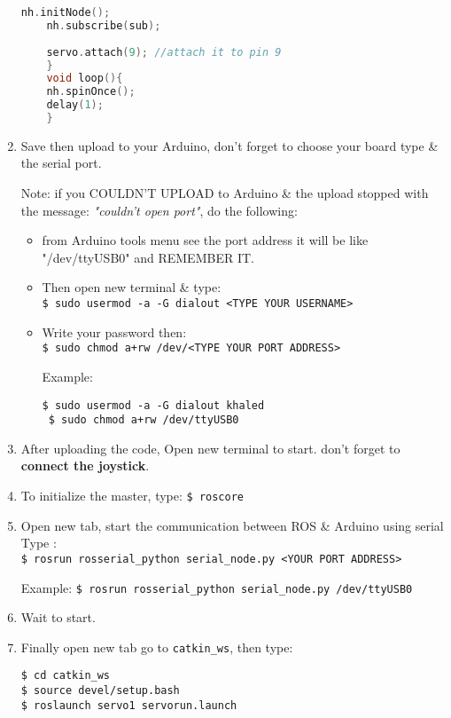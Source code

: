 \begin{enumerate}
\begin{lstlisting}[language=CPP]
 	nh.initNode();
 	nh.subscribe(sub);
 	
 	servo.attach(9); //attach it to pin 9
 	}
 	void loop(){
 	nh.spinOnce();
 	delay(1);
 	}
 	\end{lstlisting}
 	\item Save then upload to your Arduino, don't forget to choose your board type \& the serial port.
 	
 	Note: if you COULDN'T UPLOAD to Arduino \& the upload stopped with the message: \emph{"couldn't open port"}, do the following:
     \begin{itemize}
         \item from Arduino tools menu see the port address it will be like "/dev/ttyUSB0" and REMEMBER IT.
         \item Then open new terminal \& type: \\
         \lstinline|$ sudo usermod -a -G dialout <TYPE YOUR USERNAME>|
         
         \item Write your password then:\\
         \lstinline|$ sudo chmod a+rw /dev/<TYPE YOUR PORT ADDRESS>|
         
         Example:
         \begin{lstlisting}[language=terCmd]
 $ sudo usermod -a -G dialout khaled
 $ sudo chmod a+rw /dev/ttyUSB0
         \end{lstlisting}
     \end{itemize}

     \item After uploading the code, Open new terminal to start. don't forget to \textbf{connect the joystick}.
 	
     \item To initialize the master, type: \lstinline|$ roscore|
 	\item Open new tab, start the communication between ROS \& Arduino using serial Type :\\
 	\lstinline|$ rosrun rosserial_python serial_node.py <YOUR PORT ADDRESS>| 

     Example: \lstinline|$ rosrun rosserial_python serial_node.py /dev/ttyUSB0|

    \item Wait to start.
     
 	\item Finally open new tab go to \verb|catkin_ws|, then type:
     \begin{lstlisting}[language=terCmd]
$ cd catkin_ws
$ source devel/setup.bash
$ roslaunch servo1 servorun.launch
     \end{lstlisting}
 \end{enumerate}


